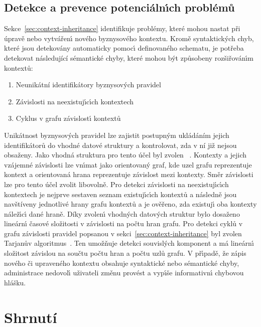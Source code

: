 \subsection{Detekce a prevence potenciáln\'{\i}ch problémů}

Sekce~\ref{sec:context-inheritance} identifikuje problémy, které
mohou nastat při úpravě nebo vytvářen\'{\i} nového byznysového kontextu.
Kromě syntaktick\'ych chyb, které jsou detekovány automaticky pomoc\'{\i} definovaného schematu,
je potřeba detekovat následující sémantické chyby, které mohou b\'yt způsobeny rozšiřován\'{\i}m kontextů:
\begin{enumerate}[label=\alph*)]
    \item Neunikátní identifikátory byznysových pravidel
    \item Závislosti na neexistuj\'{\i}c\'{\i}ch kontextech
    \item Cyklus v grafu závislost\'{\i} kontextů
\end{enumerate}

Unikátnost byznysových pravidel lze zajistit postupným ukládáním jejich identifikátorů
do vhodné datové struktury a kontrolovat, zda v ní již nejsou obsaženy. Jako vhodná struktura
pro tento účel byl zvolen ~\cite{hopcroft1983data}.
Kontexty a jejich vzájemné závislosti lze vn\'{\i}mat jako
orientovan\'y graf, kde uzel grafu reprezentuje kontext
a orientovaná hrana reprezentuje závislost mezi kontexty.
Směr závislosti lze pro tento účel zvolit libovolně.
Pro detekci závislosti na neexistuj\'{\i}c\'{\i}ch kontextech je nejprve
sestaven seznam existuj\'{\i}c\'{\i}ch kontextů a následně jsou navštíveny
jednotlivé hrany grafu kontextů a je ověřeno, zda existuj\'{\i} oba kontexty
nálež\'{\i}c\'{\i} dané hraně. Díky zvolen\'{\i} vhodn\'ych datov\'ych struktur
bylo dosaženo lineárn\'{\i} časové složitosti v závislosti na počtu hran grafu.
Pro detekci cyklů v grafu závislosti pravidel popsanou v sekci~\ref{sec:context-inheritance} byl
zvolen Tarjanův algoritmus~\cite{tarjan1971depth}. Ten umožňuje detekci souvisl\'ych
komponent a má lineárn\'{\i} složitost závislou na součtu počtu hran a
počtu uzlů grafu. V př\'{\i}padě, že zápis nového či upraveného kontextu obsahuje syntaktické
nebo sémantické chyby, administrace nedovol\'{\i} uživateli změnu provést a vyp\'{\i}še informativn\'{\i}
chybovou hlášku.

\section{Shrnutí}

